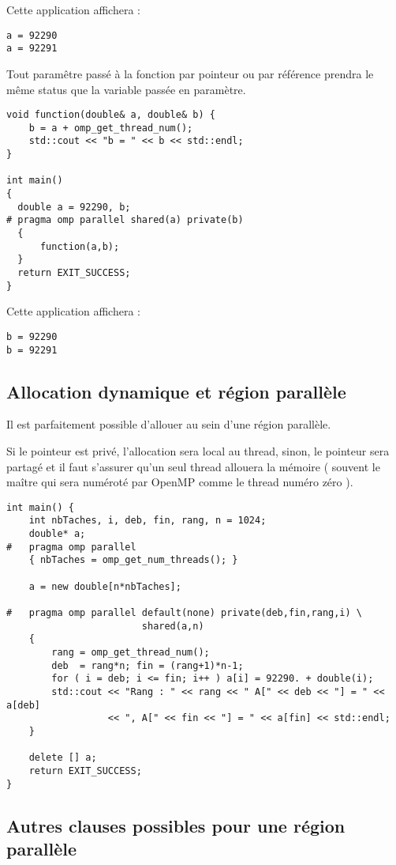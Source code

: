 \documentclass[fleqn,11pt]{article}
\begin{document}
Cette application affichera :
\begin{verbatim}
a = 92290
a = 92291
\end{verbatim}

Tout paramêtre passé à la fonction par pointeur ou par référence prendra le même status que la variable passée en paramètre.

\begin{lstlisting}
void function(double& a, double& b) {
    b = a + omp_get_thread_num();
    std::cout << "b = " << b << std::endl;
}

int main()
{
  double a = 92290, b;
# pragma omp parallel shared(a) private(b)
  {
      function(a,b);
  }
  return EXIT_SUCCESS;
}
\end{lstlisting}

Cette application affichera :
\begin{verbatim}
b = 92290
b = 92291
\end{verbatim}

\subsection{Allocation dynamique et région parallèle}

Il est parfaitement possible d'allouer au sein d'une région parallèle.

Si le pointeur est privé, l'allocation sera local au thread, sinon, le pointeur sera partagé et il faut s'assurer qu'un seul thread allouera la mémoire ( souvent le maître qui sera numéroté par OpenMP comme le thread numéro zéro ).

\begin{lstlisting}
int main() {
    int nbTaches, i, deb, fin, rang, n = 1024;
    double* a;
#   pragma omp parallel
    { nbTaches = omp_get_num_threads(); }

    a = new double[n*nbTaches];
    
#   pragma omp parallel default(none) private(deb,fin,rang,i) \
                        shared(a,n)
    {
        rang = omp_get_thread_num();
        deb  = rang*n; fin = (rang+1)*n-1;
        for ( i = deb; i <= fin; i++ ) a[i] = 92290. + double(i);
        std::cout << "Rang : " << rang << " A[" << deb << "] = " << a[deb]
                  << ", A[" << fin << "] = " << a[fin] << std::endl;
    }
    
    delete [] a;
    return EXIT_SUCCESS;
}
\end{lstlisting}

\subsection{Autres clauses possibles pour une région parallèle}
\end{document}
